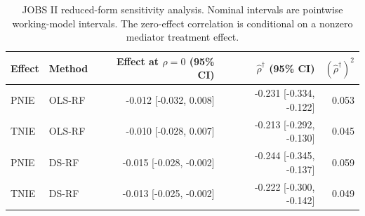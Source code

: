 \begin{table}[htbp]\centering\small\setlength{\tabcolsep}{4pt}
\caption{JOBS II reduced-form sensitivity analysis. Nominal intervals are pointwise working-model intervals. The zero-effect correlation is conditional on a nonzero mediator treatment effect.}
\label{tab:confounding-thresholds}
\begin{tabular}{llrrr}\toprule
Effect & Method & Effect at $\rho=0$ (95\% CI) & $\widehat\rho^\dagger$ (95\% CI) & $(\widehat\rho^\dagger)^2$\\\midrule
PNIE & OLS-RF & -0.012 [-0.032, 0.008] & -0.231 [-0.334, -0.122] & 0.053\\
TNIE & OLS-RF & -0.010 [-0.028, 0.007] & -0.213 [-0.292, -0.130] & 0.045\\
PNIE & DS-RF & -0.015 [-0.028, -0.002] & -0.244 [-0.345, -0.137] & 0.059\\
TNIE & DS-RF & -0.013 [-0.025, -0.002] & -0.222 [-0.300, -0.142] & 0.049\\
\bottomrule\end{tabular}\end{table}
